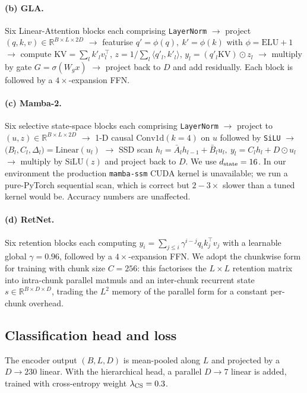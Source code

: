 \documentclass[final]{ws-ijwmip}
\begin{document}
\paragraph{(b) GLA.}
Six Linear-Attention blocks each comprising
\texttt{LayerNorm} $\to$ project $(q,k,v)\in\mathbb{R}^{B\times L\times 2D}$
$\to$ featurise $q'=\phi(q),\ k'=\phi(k)$ with
$\phi=\mathrm{ELU}+1$ $\to$ compute
$\mathrm{KV}=\sum_l k'_l v_l^\top$, $z = 1/\sum_l\langle q'_l, k'_l\rangle$,
$y_l = (q'_l \mathrm{KV})\odot z_l$ $\to$ multiply by gate
$G=\sigma(W_g x)$ $\to$ project back to $D$ and add residually.
Each block is followed by a $4\times$-expansion FFN.

\paragraph{(c) Mamba-2.}
Six selective state-space blocks each comprising
\texttt{LayerNorm} $\to$ project to $(u, z)\in\mathbb{R}^{B\times L\times 2D}$ $\to$
1-D causal $\mathrm{Conv1d}(k=4)$ on $u$ followed by \texttt{SiLU} $\to$
$\bigl(B_l, C_l, \Delta_l\bigr) = \mathrm{Linear}(u_l)$ $\to$ SSD scan
$h_l = \bar A_l h_{l-1} + \bar B_l u_l,\ y_l = C_l h_l + D\odot u_l$ $\to$
multiply by $\mathrm{SiLU}(z)$ and project back to $D$. We use
$d_{\rm state}=16$. In our environment the production
\texttt{mamba-ssm} CUDA kernel is unavailable; we run a pure-PyTorch
sequential scan, which is correct but $2\!-\!3\times$ slower than a
tuned kernel would be. Accuracy numbers are unaffected.

\paragraph{(d) RetNet.}
Six retention blocks each computing
$y_i = \sum_{j\leq i} \gamma^{i-j} q_i k_j^\top v_j$ with a learnable
global $\gamma=0.96$, followed by a $4\times$-expansion FFN. We adopt
the chunkwise form for training with chunk size $C=256$: this
factorises the $L\times L$ retention matrix into intra-chunk parallel
matmuls and an inter-chunk recurrent state $s\in\mathbb{R}^{B\times D\times D}$,
trading the $L^2$ memory of the parallel form for a constant
per-chunk overhead.


\subsection{Classification head and loss}

The encoder output $(B, L, D)$ is mean-pooled along $L$ and projected by
a $D\!\to\!230$ linear. With the hierarchical head, a parallel
$D\!\to\!7$ linear is added, trained with cross-entropy weight
$\lambda_{\rm CS}=0.3$.
\end{document}
